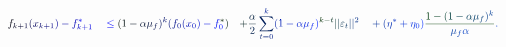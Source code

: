 \documentclass[12pt]{article}
\begin{document}
\makeatletter
\renewcommand*{\@textcolor}[3]{%
  \protect\leavevmode
  \begingroup
    \color#1{#2}#3%
  \endgroup
}
\makeatother
\begin{displaymath}
\begin{array} {rlrl} \displaystyle { \mathcolor[RGB]{0,0,15}{f} _ { \mathcolor[RGB]{0,0,30}{k} \mathcolor[RGB]{0,0,45}{+} \mathcolor[RGB]{0,0,60}{1} } \mathcolor[RGB]{0,0,75}{(} \mathcolor[RGB]{0,0,90}{x} _ { \mathcolor[RGB]{0,0,105}{k} \mathcolor[RGB]{0,0,120}{+} \mathcolor[RGB]{0,0,135}{1} } \mathcolor[RGB]{0,0,150}{)} \mathcolor[RGB]{0,0,165}{-} \mathcolor[RGB]{0,0,180}{f} _ { \mathcolor[RGB]{0,0,195}{k} \mathcolor[RGB]{0,0,210}{+} \mathcolor[RGB]{0,0,225}{1} } ^ { \mathcolor[RGB]{0,0,240}{*} } } & \displaystyle { { } \mathcolor[RGB]{0,0,255}{\leq} \mathcolor[RGB]{0,15,0}{(} \mathcolor[RGB]{0,15,15}{1} \mathcolor[RGB]{0,15,30}{-} \mathcolor[RGB]{0,15,45}{\alpha} \mathcolor[RGB]{0,15,60}{\mu} _ { \mathcolor[RGB]{0,15,75}{f} } \mathcolor[RGB]{0,15,90}{)} ^ { \mathcolor[RGB]{0,15,105}{k} } \mathcolor[RGB]{0,15,120}{(} \mathcolor[RGB]{0,15,135}{f} _ { \mathcolor[RGB]{0,15,150}{0} } \mathcolor[RGB]{0,15,165}{(} \mathcolor[RGB]{0,15,180}{x} _ { \mathcolor[RGB]{0,15,195}{0} } \mathcolor[RGB]{0,15,210}{)} \mathcolor[RGB]{0,15,225}{-} \mathcolor[RGB]{0,15,240}{f} _ { \mathcolor[RGB]{0,15,255}{0} } ^ { \mathcolor[RGB]{0,30,0}{*} } \mathcolor[RGB]{0,30,15}{)} } & \displaystyle { \mathcolor[RGB]{0,30,30}{+} \mathcolor[RGB]{0,30,45}{\frac { \mathcolor[RGB]{0,30,60}{\alpha} } { \mathcolor[RGB]{0,30,75}{2} } } \mathcolor[RGB]{0,30,90}{\sum} _ { \mathcolor[RGB]{0,30,105}{t} \mathcolor[RGB]{0,30,120}{=} \mathcolor[RGB]{0,30,135}{0} } ^ { \mathcolor[RGB]{0,30,150}{k} } \mathcolor[RGB]{0,30,165}{(} \mathcolor[RGB]{0,30,180}{1} \mathcolor[RGB]{0,30,195}{-} \mathcolor[RGB]{0,30,210}{\alpha} \mathcolor[RGB]{0,30,225}{\mu} _ { \mathcolor[RGB]{0,30,240}{f} } \mathcolor[RGB]{0,30,255}{)} ^ { \mathcolor[RGB]{0,45,0}{k} \mathcolor[RGB]{0,45,15}{-} \mathcolor[RGB]{0,45,30}{t} } \mathcolor[RGB]{0,45,45}{|} \mathcolor[RGB]{0,45,60}{|} \mathcolor[RGB]{0,45,75}{\varepsilon} _ { \mathcolor[RGB]{0,45,90}{t} } \mathcolor[RGB]{0,45,105}{|} \mathcolor[RGB]{0,45,120}{|} ^ { \mathcolor[RGB]{0,45,135}{2} } } & \displaystyle { { } \mathcolor[RGB]{0,45,150}{+} \mathcolor[RGB]{0,45,165}{(} \mathcolor[RGB]{0,45,180}{\eta} ^ { \mathcolor[RGB]{0,45,195}{*} } \mathcolor[RGB]{0,45,210}{+} \mathcolor[RGB]{0,45,225}{\eta} _ { \mathcolor[RGB]{0,45,240}{0} } \mathcolor[RGB]{0,45,255}{)} \mathcolor[RGB]{0,60,0}{\frac { \mathcolor[RGB]{0,60,15}{1} \mathcolor[RGB]{0,60,30}{-} \mathcolor[RGB]{0,60,45}{(} \mathcolor[RGB]{0,60,60}{1} \mathcolor[RGB]{0,60,75}{-} \mathcolor[RGB]{0,60,90}{\alpha} \mathcolor[RGB]{0,60,105}{\mu} _ { \mathcolor[RGB]{0,60,120}{f} } \mathcolor[RGB]{0,60,135}{)} ^ { \mathcolor[RGB]{0,60,150}{k} } } { \mathcolor[RGB]{0,60,165}{\mu} _ { \mathcolor[RGB]{0,60,180}{f} } \mathcolor[RGB]{0,60,195}{\alpha} } } \mathcolor[RGB]{0,60,210}{.} } \end{array}
\end{displaymath}
\end{document}
